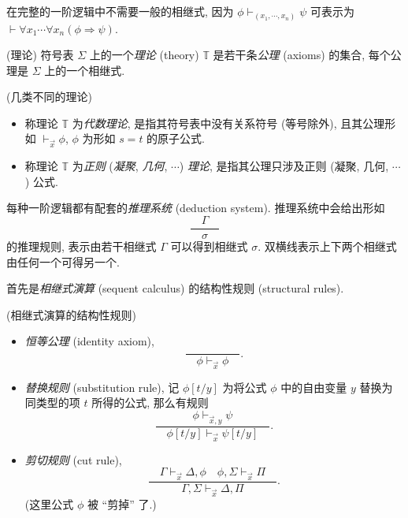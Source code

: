 \begin{remark}
	{}
	在完整的一阶逻辑中不需要一般的相继式, 因为
	$\phi \vdash_{(x_1,\cdots,x_n)} \psi$ 可表示为
	$\vdash \forall x_1\cdots \forall x_n (\phi\Rightarrow \psi)$.
\end{remark}

\begin{definition}
	{(理论)}
	符号表 $\Sigma$ 上的一个\emph{理论} (theory) $\mathbb T$ 是若干条\emph{公理} (axioms) 的集合, 每个公理是 $\Sigma$ 上的一个相继式.
\end{definition}

\begin{definition}
	[label={kinds-of-theories}]
	{(几类不同的理论)}
	\begin{itemize}
		\item 称理论 $\mathbb T$ 为\emph{代数理论}, 是指其符号表中没有关系符号 (等号除外), 且其公理形如 $\vdash_{\vec x}\phi$, $\phi$ 为形如 $s=t$ 的原子公式.
		\item 称理论 $\mathbb T$ 为\emph{正则} (\emph{凝聚}, \emph{几何}, $\cdots$) \emph{理论}, 是指其公理只涉及正则 (凝聚, 几何, $\cdots$) 公式.
	\end{itemize}
\end{definition}


\newcommand{\sqc}[2]{\frac{\quad #1 \quad}{\quad #2 \quad}}
\newcommand{\sqqc}[2]{
	\begin{array}
		{c}
		#1 \\ \hline \hline #2
	\end{array}
}

每种一阶逻辑都有配套的\emph{推理系统} (deduction system). 推理系统中会给出形如
$$
\sqc{\Gamma}{\sigma}
$$
的推理规则, 表示由若干相继式 $\Gamma$ 可以得到相继式 $\sigma$.
双横线表示上下两个相继式由任何一个可得另一个.

首先是\emph{相继式演算} (sequent calculus) 的结构性规则 (structural rules).

\begin{definition}
	{(相继式演算的结构性规则)}
	\begin{itemize}
		\item \emph{恒等公理} (identity axiom),
		$$
		\sqc{}{\phi\vdash_{\vec x} \phi}.
		$$
		\item \emph{替换规则} (substitution rule),
		记 $\phi[t/y]$ 为将公式 $\phi$ 中的自由变量 $y$ 替换为同类型的项 $t$ 所得的公式, 那么有规则
		$$
		\sqc{\phi \vdash_{\vec x,y} \psi}{\phi[t/y]\vdash_{\vec x}\psi[t/y]}.
		$$
		\item \emph{剪切规则} (cut rule),
		$$
		\sqc{
			\Gamma \vdash_{\vec x} \Delta , \phi
			\quad
			\phi, \Sigma \vdash_{\vec x} \Pi 
		}{
			\Gamma,\Sigma \vdash_{\vec x} \Delta,\Pi
		}.
		$$
		(这里公式 $\phi$ 被 ``剪掉'' 了.)
	\end{itemize}
\end{definition}

